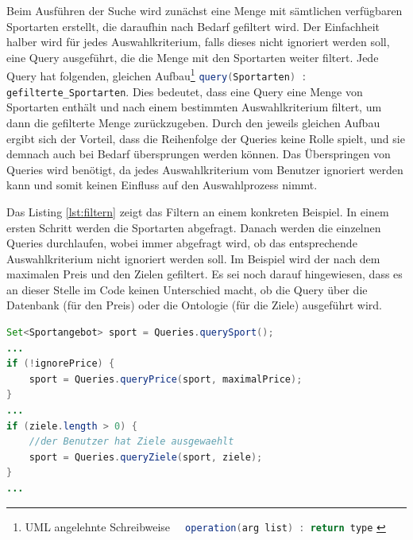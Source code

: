 Beim Ausf\"uhren der Suche wird zun\"achst eine Menge mit s\"amtlichen verf\"ugbaren Sportarten erstellt, die daraufhin nach Bedarf gefiltert wird. Der Einfachheit halber wird f\"ur jedes Auswahlkriterium, falls dieses nicht ignoriert werden soll, eine Query ausgef\"uhrt, die die Menge mit den Sportarten weiter filtert. Jede Query hat folgenden, gleichen Aufbau\footnote{UML angelehnte Schreibweise \lstinline[language=Java]"  operation(arg list) : return type" \autocite{kow:umlclass}} \lstinline[language=Java]"query(Sportarten) : gefilterte_Sportarten". Dies bedeutet, dass eine Query eine Menge von Sportarten enth\"alt und nach einem bestimmten Auswahlkriterium filtert, um dann die gefilterte Menge zur\"uckzugeben. Durch den jeweils gleichen Aufbau ergibt sich der Vorteil, dass die Reihenfolge der Queries keine Rolle spielt, und sie demnach auch bei Bedarf \"ubersprungen werden k\"onnen. Das \"Uberspringen von Queries wird ben\"otigt, da jedes Auswahlkriterium vom Benutzer ignoriert werden kann und somit keinen Einfluss auf den Auswahlprozess nimmt.

Das Listing \ref{lst:filtern} zeigt das Filtern an einem konkreten Beispiel. In einem ersten Schritt werden die Sportarten abgefragt. Danach werden die einzelnen Queries durchlaufen, wobei immer abgefragt wird, ob das entsprechende Auswahlkriterium nicht ignoriert werden soll. Im Beispiel wird der nach dem maximalen Preis und den Zielen gefiltert. Es sei noch darauf hingewiesen, dass es an dieser Stelle im Code keinen Unterschied macht, ob die Query \"uber die Datenbank (f\"ur den Preis) oder die Ontologie (f\"ur die Ziele) ausgef\"uhrt wird. 

\begin{lstlisting}[float=htbp, caption=Filtern von Sportarten, label=lst:filtern, language=JAVA]
Set<Sportangebot> sport = Queries.querySport();
...        
if (!ignorePrice) {
	sport = Queries.queryPrice(sport, maximalPrice);
}
...
if (ziele.length > 0) {
	//der Benutzer hat Ziele ausgewaehlt
	sport = Queries.queryZiele(sport, ziele);
}
...                
\end{lstlisting}
